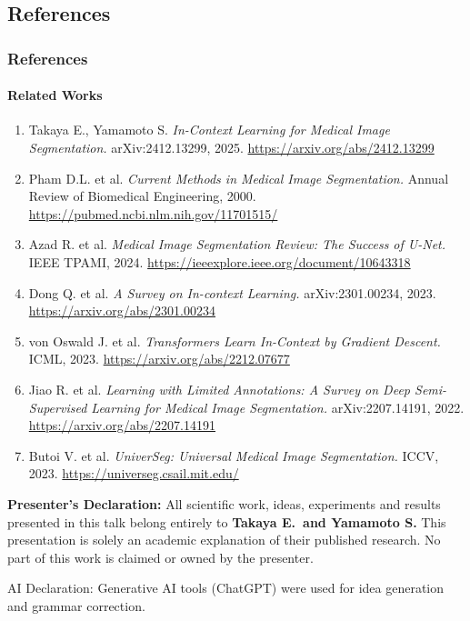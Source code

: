\documentclass[nometaot,lecture,amberg,toc=twocolumn,indicatelastpageofframe,footlinebox]{OTHAWbeamer}
\begin{document}
\subsection{References}
\begin{frame}[label=refslide]
    \frametitle{References}
    \framesubtitle{Related Works}

    {\tiny
    \begin{enumerate}
        \item Takaya E., Yamamoto S. \textit{In-Context Learning for Medical Image Segmentation.}
              arXiv:2412.13299, 2025.
              \url{https://arxiv.org/abs/2412.13299}

        \item Pham D.L. et al. \textit{Current Methods in Medical Image Segmentation.}
              Annual Review of Biomedical Engineering, 2000.
              \url{https://pubmed.ncbi.nlm.nih.gov/11701515/}

        \item Azad R. et al. \textit{Medical Image Segmentation Review: The Success of U-Net.}
              IEEE TPAMI, 2024.
              \url{https://ieeexplore.ieee.org/document/10643318}

        \item Dong Q. et al. \textit{A Survey on In-context Learning.}
              arXiv:2301.00234, 2023.
              \url{https://arxiv.org/abs/2301.00234}

        \item von Oswald J. et al. \textit{Transformers Learn In-Context by Gradient Descent.}
              ICML, 2023.
              \url{https://arxiv.org/abs/2212.07677}

        \item Jiao R. et al. \textit{Learning with Limited Annotations: A Survey on Deep
              Semi-Supervised Learning for Medical Image Segmentation.}
              arXiv:2207.14191, 2022.
              \url{https://arxiv.org/abs/2207.14191}

        \item Butoi V. et al. \textit{UniverSeg: Universal Medical Image Segmentation.}
              ICCV, 2023.
              \url{https://universeg.csail.mit.edu/}
    \end{enumerate}
    }

    \vspace{0.5em}
    \begin{alertblock}{}
        \small\textbf{Presenter's Declaration:} All scientific work, ideas, experiments and results presented in this talk belong entirely to \textbf{Takaya E.\ and Yamamoto S.} This presentation is solely an academic explanation of their published research. No part of this work is claimed or owned by the presenter.
    \end{alertblock}

    \vspace{0.3em}
    {\tiny\textcolor{grau2}{AI Declaration: Generative AI tools (ChatGPT) were used for idea generation and grammar correction.}}

\end{frame}
\end{document}
